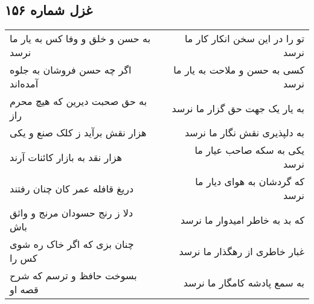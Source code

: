 \begin{center}
\section*{غزل شماره ۱۵۶}
\label{sec:sh156}
\begin{longtable}{l p{0.5cm} r}
به حسن و خلق و وفا کس به یار ما نرسد
&&
تو را در این سخن انکار کار ما نرسد
\\
اگر چه حسن فروشان به جلوه آمده‌اند
&&
کسی به حسن و ملاحت به یار ما نرسد
\\
به حق صحبت دیرین که هیچ محرم راز
&&
به یار یک جهت حق گزار ما نرسد
\\
هزار نقش برآید ز کلک صنع و یکی
&&
به دلپذیری نقش نگار ما نرسد
\\
هزار نقد به بازار کائنات آرند
&&
یکی به سکه صاحب عیار ما نرسد
\\
دریغ قافله عمر کان چنان رفتند
&&
که گردشان به هوای دیار ما نرسد
\\
دلا ز رنج حسودان مرنج و واثق باش
&&
که بد به خاطر امیدوار ما نرسد
\\
چنان بزی که اگر خاک ره شوی کس را
&&
غبار خاطری از رهگذار ما نرسد
\\
بسوخت حافظ و ترسم که شرح قصه او
&&
به سمع پادشه کامگار ما نرسد
\\
\end{longtable}
\end{center}
